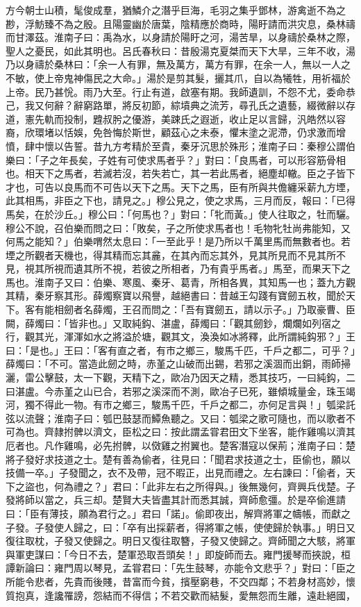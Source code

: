 \begin{pinyinscope}
方今朝士山積，髦俊成羣，猶鱗介之潛乎巨海，毛羽之集乎鄧林，游禽逝不為之尠，浮魴臻不為之殷。且陽靈幽於唐葉，陰精應於商時，陽盱請而洪灾息，桑林禱而甘澤茲。淮南子曰：禹為水，以身請於陽盱之河，湯苦旱，以身禱於桑林之際，聖人之憂民，如此其明也。呂氏春秋曰：昔殷湯克夏桀而天下大旱，三年不收，湯乃以身禱於桑林曰：「余一人有罪，無及萬方，萬方有罪，在余一人，無以一人之不敏，使上帝鬼神傷民之大命。」湯於是剪其髮，攦其爪，自以為犧牲，用祈福於上帝。民乃甚恱。雨乃大至。行止有道，啟塞有期。我師遺訓，不怨不尤，委命恭己，我又何辭？辭窮路單，將反初節，綜墳典之流芳，尋孔氏之遺藝，綴微辭以存道，憲先軌而投制，韙叔肹之優游，美踈氏之遐逝，收止足以言歸，汎皓然以容裔，欣環堵以恬娛，免咎悔於斯世，顧茲心之未泰，懼末塗之泥滯，仍求激而增憤，肆中懷以告誓。昔九方考精於至貴，秦牙沉思於殊形；淮南子曰：秦穆公謂伯樂曰：「子之年長矣，子姓有可使求馬者乎？」對曰：「良馬者，可以形容筋骨相也。相天下之馬者，若滅若沒，若失若亡，其一若此馬者，絕塵却轍。臣之子皆下才也，可告以良馬而不可告以天下之馬。天下之馬，臣有所與共儋纏采薪九方堙，此其相馬，非臣之下也，請見之。」穆公見之，使之求馬，三月而反，報曰：「已得馬矣，在於沙丘。」穆公曰：「何馬也？」對曰：「牝而黃。」使人往取之，牡而驪。穆公不說，召伯樂而問之曰：「敗矣，子之所使求馬者也！毛物牝牡尚弗能知，又何馬之能知？」伯樂喟然太息曰：「一至此乎！是乃所以千萬里馬而無數者也。若堙之所觀者天機也，得其精而忘其麄，在其內而忘其外，見其所見而不見其所不見，視其所視而遺其所不視，若彼之所相者，乃有貴乎馬者。」馬至，而果天下之馬也。淮南子又曰：伯樂、寒風、秦牙、葛青，所相各異，其知馬一也；蓋九方觀其精，秦牙察其形。薛燭察寶以飛譽，越絕書曰：昔越王勾踐有寶劒五枚，聞於天下。客有能相劒者名薛燭，王召而問之：「吾有寶劒五，請以示子。」乃取豪曹、臣闕，薛燭曰：「皆非也。」又取純鈎、湛盧，薛燭曰：「觀其劒鈔，爛爛如列宿之行，觀其光，渾渾如水之將溢於塘，觀其文，渙渙如冰將釋，此所謂純鈎邪？」王曰：「是也。」王曰：「客有直之者，有市之鄉三，駿馬千匹，千戶之都二，可乎？」薛燭曰：「不可。當造此劒之時，赤堇之山破而出錫，若邪之溪涸而出銅，雨師掃灑，雷公擊鼓，太一下觀，天精下之，歐冶乃因天之精，悉其技巧，一曰純鈎，二曰湛盧。今赤堇之山已合，若邪之溪深而不測，歐冶子已死，雖傾城量金，珠玉竭河，獨不得此一物。有市之鄉三，駿馬千匹，千戶之都二，亦何足言與！」瓠梁託弦以流聲；淮南子曰：瓠巴鼓瑟而鱏魚聽之。又曰：瓠梁之歌可隨也，而以歌者不可為也。齊隷拊髀以濟文，臣松之曰：按此謂孟甞君田文下坐客，能作雞鳴以濟其厄者也。凡作雞鳴，必先拊髀，以傚雞之拊翼也。楚客潛寇以保荊；淮南子曰：楚將子發好求技道之士。楚有善為偷者，往見曰：「聞君求技道之士，臣偷也，願以技備一卒。」子發聞之，衣不及帶，冠不暇正，出見而禮之。左右諫曰：「偷者，天下之盜也，何為禮之？」君曰：「此非左右之所得與。」後無幾何，齊興兵伐楚。子發將師以當之，兵三却。楚賢大夫皆盡其計而悉其誠，齊師愈彊。於是卒偷進請曰：「臣有薄技，願為君行之。」君曰「諾」。偷即夜出，解齊將軍之幬帳，而獻之子發。子發使人歸之，曰：「卒有出採薪者，得將軍之帳，使使歸於執事。」明日又復往取枕，子發又使歸之。明日又復往取簪，子發又使歸之。齊師聞之大駭，將軍與軍吏謀曰：「今日不去，楚軍恐取吾頭矣！」即旋師而去。雍門援琴而挾說，桓譚新論曰：雍門周以琴見，孟甞君曰：「先生鼓琴，亦能令文悲乎？」對曰：「臣之所能令悲者，先貴而後賤，昔富而今貧，擯壓窮巷，不交四鄰；不若身材高妙，懷質抱真，逢讒罹謗，怨結而不得信；不若交歡而結髮，愛無怨而生離，遠赴絕國，
\end{pinyinscope}
